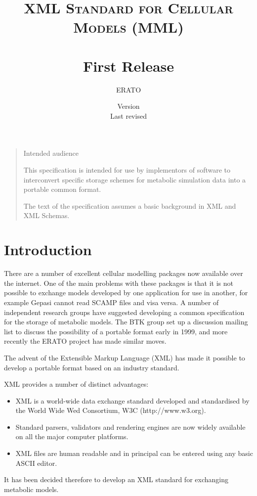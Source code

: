 \documentclass{article}
\title{{\scshape XML Standard for Cellular \\ Models (MML)} \\ \  \\ First Release}
\author{ERATO \\}
\date{Version \versionno\\Last revised \docdate}
\begin{document}
\maketitle

\begin{quotation}
\begin{center}
Intended audience
\end{center}

\medskip\noindent
This specification is intended for use by implementors of software to
interconvert specific storage schemes for metabolic simulation data
into a portable common format.

\medskip\noindent
The text of the specification assumes a basic background in XML and XML
Schemas.
\end{quotation}

\section*{Introduction}

There are a number of excellent cellular modelling packages now available over
the internet. One of the main problems with these packages is that it is not
possible to exchange models developed by one application for use in another,
for example Gepasi cannot read SCAMP files and visa versa. A number of
independent research groups have suggested developing a common specification
for the storage of metabolic models.  The BTK group set up a discussion
mailing list to discuss the possibility of a portable format early in 1999,
and more recently the ERATO project has made similar moves.

The advent of the Extensible Markup Language (XML) has made it possible to
develop a portable format based on an industry standard.

XML provides a number of distinct advantages:

\begin{itemize}
\item XML is a world-wide data exchange standard developed and standardised by
the World Wide Wed Consortium, W3C (http://www.w3.org).
\item Standard parsers, validators and rendering engines are now widely available on all
the major computer platforms.
\item XML files are human readable and in principal can be entered using any
basic ASCII editor.
\end{itemize}

It has been decided therefore to develop an XML standard for exchanging
metabolic models.
\end{document}

